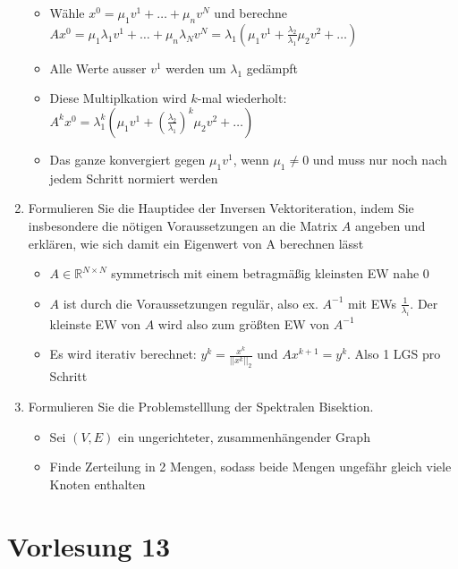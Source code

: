 \documentclass[]{article}
\newcommand*{\real}{\ensuremath{\mathbb{R}}}
\begin{document}
\begin{enumerate}
\begin{itemize}
				\item Wähle $x^0 = \mu_1v^1 + \dots + \mu_nv^N$ und berechne $Ax^0 = \mu_1\lambda_1v^1 + \dots + \mu_n\lambda_Nv^N = \lambda_1 ( \mu_1v^1 + \frac{\lambda_2}{\lambda_1}\mu_2v^2 + \dots)$
				\item Alle Werte ausser $v^1$ werden um $\lambda_1$ gedämpft
				\item Diese Multiplkation wird $k$-mal wiederholt: $A^kx^0 = \lambda_1^k ( \mu_1v^1 + (\frac{\lambda_2}{\lambda_1})^k \mu_2v^2 + \dots)$
				\item Das ganze konvergiert gegen $\mu_1v^1$, wenn $\mu_1 \neq 0$ und muss nur noch nach jedem Schritt normiert werden
			\end{itemize}
		\item Formulieren Sie die Hauptidee der Inversen Vektoriteration, indem Sie insbesondere die nötigen Voraussetzungen an die Matrix $A$ angeben und erklären, wie sich damit ein Eigenwert von A berechnen lässt
			\begin{itemize}
				\item $A \in \real^{N \times N}$ symmetrisch mit einem betragmäßig kleinsten EW nahe $0$
				\item $A$ ist durch die Voraussetzungen regulär, also ex. $A^{-1}$ mit EWs $\frac{1}{\lambda_i}$. Der kleinste EW von $A$ wird also zum größten EW von $A^{-1}$
				\item Es wird iterativ berechnet: $y^k = \frac{x^k}{||x^k||_2}$ und $Ax^{k+1} = y^k$. Also 1 LGS pro Schritt
			\end{itemize}
		\item Formulieren Sie die Problemstelllung der Spektralen Bisektion.
			\begin{itemize}
				\item Sei $(V,E)$ ein ungerichteter, zusammenhängender Graph
				\item Finde Zerteilung in 2 Mengen, sodass beide Mengen ungefähr gleich viele Knoten enthalten
			\end{itemize}
	\end{enumerate}

\section{Vorlesung 13}
\end{document}
